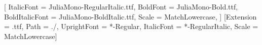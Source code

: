 \newfontfamily{}[
  ItalicFont = JuliaMono-RegularItalic.ttf,
  BoldFont = JuliaMono-Bold.ttf,
  BoldItalicFont = JuliaMono-BoldItalic.ttf,
  Scale = MatchLowercase,
]
\setmonofont{JuliaMono}[Extension = .ttf, Path = ./, UprightFont = *-Regular, ItalicFont = *-RegularItalic, Scale = MatchLowercase]
\newcommand{\agda}[1]{{\juliamono #1}}

\newcommand{\defn}[1]{\emph{#1}}

\newcommand{\N}{\mathbb{N}}
\newcommand{\Z}{\mathbb{Z}}
\newcommand{\Q}{\mathbb{Q}}
\newcommand{\Qp}{\Q_{+}}
\newcommand{\R}{\mathbb{R}}
\newcommand{\RR}{\R}
\newcommand{\QQ}{\Q}

\newcommand{\rational}{\mathsf{rational}}
\newcommand{\limit}{\mathsf{limit}}
\newcommand{\cpath}{\mathsf{path}}
\newcommand{\transport}{\mathsf{transport}}
\newcommand{\induction}{\mathsf{induction}}
\newcommand{\recursion}{\mathsf{recursion}}
\newcommand{\IsCauchy}{\mathsf{IsCauchy}}
\newcommand{\dclosesym}{\mathord\frown}
\newcommand{\apart}{\mathrel{\#}}
\newcommand{\unittype}{\mathbf{1}}
\newcommand{\emptytype}{\mathbf{0}}
\newcommand{\trunc}[2]{\mathopen{}\left\Vert #2\right\Vert_{#1}\mathclose{}}
\newcommand{\bracket}[1]{\trunc{}{#1}}


\newcommand{\completion}[1]{\mathfrak{C}\,#1}
\newcommand{\lift}[1]{\overline{#1}}
\newcommand{\closesym}{\approx}

\newcommand{\op}[1]{#1^{\mathrm{op}}}

\DeclareMathOperator{\uncurry}{uncurry}
\DeclareMathOperator{\flip}{flip}
\DeclareMathOperator{\id}{id}

\newcommand{\todoproof}[1]{\todo[inline]{TODO: Prove \agda{#1}}}

\lstset{style=mystyle}
